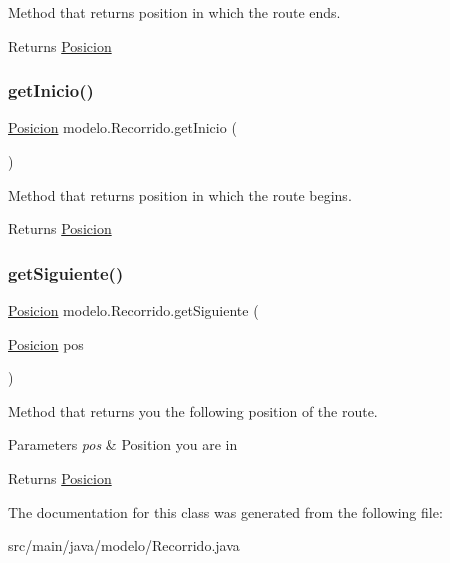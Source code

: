 Method that returns position in which the route ends. 

\begin{DoxyReturn}{Returns}
\mbox{\hyperlink{classmodelo_1_1_posicion}{Posicion}} 
\end{DoxyReturn}
\mbox{\label{classmodelo_1_1_recorrido_ace70d961807be77d6fec75142c2e630b}} 
\subsubsection{\texorpdfstring{get\+Inicio()}{getInicio()}}
{\footnotesize\ttfamily \mbox{\hyperlink{classmodelo_1_1_posicion}{Posicion}} modelo.\+Recorrido.\+get\+Inicio (\begin{DoxyParamCaption}{ }\end{DoxyParamCaption})}



Method that returns position in which the route begins. 

\begin{DoxyReturn}{Returns}
\mbox{\hyperlink{classmodelo_1_1_posicion}{Posicion}} 
\end{DoxyReturn}
\mbox{\label{classmodelo_1_1_recorrido_a30ce3f0f577225221cca2ac099a6a6b6}} 
\subsubsection{\texorpdfstring{get\+Siguiente()}{getSiguiente()}}
{\footnotesize\ttfamily \mbox{\hyperlink{classmodelo_1_1_posicion}{Posicion}} modelo.\+Recorrido.\+get\+Siguiente (\begin{DoxyParamCaption}\item[{\mbox{\hyperlink{classmodelo_1_1_posicion}{Posicion}}}]{pos }\end{DoxyParamCaption})}



Method that returns you the following position of the route. 


\begin{DoxyParams}{Parameters}
{\em pos} & Position you are in \\
\hline
\end{DoxyParams}
\begin{DoxyReturn}{Returns}
\mbox{\hyperlink{classmodelo_1_1_posicion}{Posicion}} 
\end{DoxyReturn}


The documentation for this class was generated from the following file\+:\begin{DoxyCompactItemize}
\item 
src/main/java/modelo/Recorrido.\+java\end{DoxyCompactItemize}
